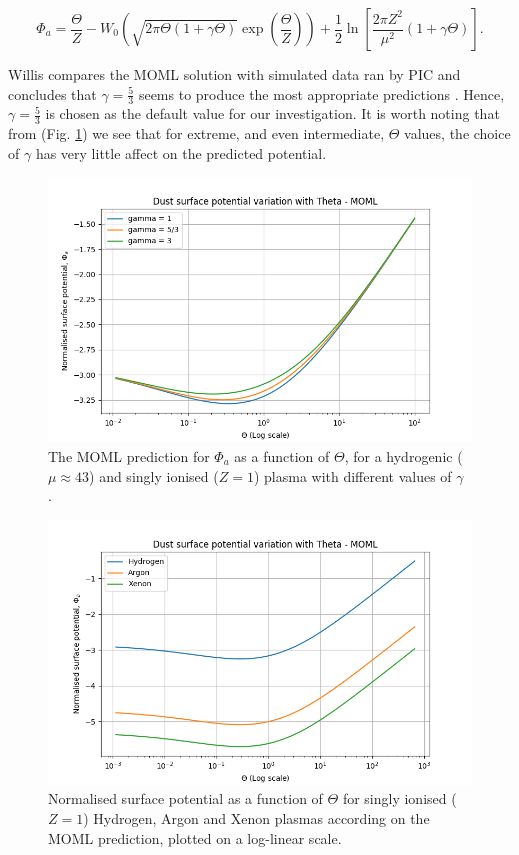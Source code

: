 \documentclass{article}
\begin{document}
\begin{equation}\label{eq:MOMLsol}
\Phi_a =  \frac{\Theta}{Z} - W_{0}\left(\sqrt{2\pi \Theta (1 + \gamma \Theta)} \exp{\left (\frac{\Theta}{Z}\right)}\right) + \frac{1}{2}\ln{\left[\frac{2\pi Z^2}{\mu^2}(1 + \gamma \Theta)\right]}.
\end{equation}

Willis compares the MOML solution with simulated data ran by PIC and concludes that 
$\gamma = \frac{5}{3}$ seems to produce the most appropriate predictions \cite{Willis}. 
Hence, $\gamma = \frac{5}{3}$ is chosen as the default value for our investigation. It is worth noting
that from (Fig. \ref{MOMLgamma}) we see that for extreme, and even intermediate, $\Theta$ values, 
the choice of $\gamma$ has very little affect on the predicted potential.

\begin{figure}[H]
\centering
\includegraphics[width=\linewidth]{Output/MOMLgamma.jpeg}
\caption{The MOML prediction for  $\Phi_a$ as a function of $\Theta$, for a hydrogenic ($\mu \approx 43$) and singly ionised ($Z = 1$) plasma with different values of $\gamma$ \cite{Thomas}.}
\label{MOMLgamma} 
\end{figure}


\begin{figure}[H]
\centering
\includegraphics[width=\linewidth]{Output/MOMLgraph.jpeg}
\caption{Normalised surface potential as a function of $\Theta$ for singly ionised ($Z = 1$) Hydrogen, Argon and Xenon plasmas according on the MOML prediction, plotted on a log-linear scale.}
\label{MOMLgraph} 
\end{figure}
    
\end{document}

